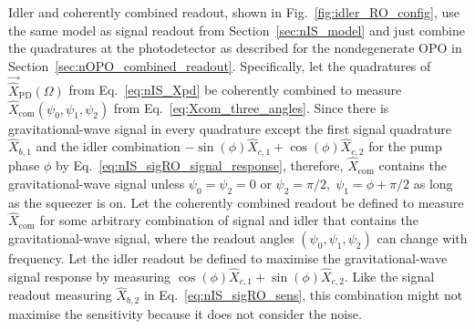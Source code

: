 Idler and coherently combined readout, shown in Fig.~\ref{fig:idler_RO_config}, use the same model as signal readout from Section~\ref{sec:nIS_model} and just combine the quadratures at the photodetector as described for the nondegenerate OPO in Section~\ref{sec:nOPO_combined_readout}. Specifically, let the quadratures of $\vec{\hat X}_\text{PD}(\Omega)$ from Eq.~\ref{eq:nIS_Xpd} be coherently combined to measure $\hat{X}_\text{com}(\psi_0,\psi_1,\psi_2)$ from Eq.~\ref{eq:Xcom_three_angles}. Since there is gravitational-wave signal in every quadrature except the first signal quadrature $\hat{X}_{b,1}$ and the idler combination $-\sin(\phi)\hat{X}_{c,1}+\cos(\phi)\hat{X}_{c,2}$ for the pump phase $\phi$ by Eq.~\ref{eq:nIS_sigRO_signal_response}, therefore, $\hat{X}_\text{com}$ contains the gravitational-wave signal unless $\psi_0=\psi_2=0$ or $\psi_2=\pi/2,\;\psi_1=\phi+\pi/2$ as long as the squeezer is on. 
Let the coherently combined readout be defined to measure $\hat{X}_\text{com}$ for some arbitrary combination of signal and idler that contains the gravitational-wave signal, where the readout angles $(\psi_0,\psi_1,\psi_2)$ can change with frequency.
Let the idler readout be defined to maximise the gravitational-wave signal response by measuring $\cos(\phi)\hat{X}_{c,1}+\sin(\phi)\hat{X}_{c,2}$. Like the signal readout measuring $\hat{X}_{b,2}$ in Eq.~\ref{eq:nIS_sigRO_sens}, this combination might not maximise the sensitivity because it does not consider the noise. %
